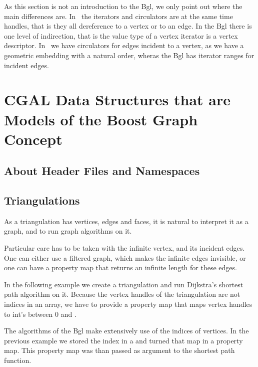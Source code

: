 As this section is not an introduction to the {\sc Bgl}, we only point out
where the main differences are. In \cgal\ the iterators and circulators
are at the same time handles, that is they all dereference to a vertex
or to an edge. In the {\sc Bgl} there is one level of indirection, that
is the value type of a vertex iterator is a vertex descriptor.  In \cgal\ 
we have circulators for edges incident to a vertex, as we have a
geometric embedding with a natural order, wheras the {\sc Bgl} 
has iterator ranges for incident edges.  




\section{CGAL Data Structures that are Models of the Boost Graph Concept}

\subsection{About Header Files and Namespaces}


\subsection{Triangulations}

As a triangulation has vertices, edges and faces, it is natural to interpret it as a graph,
and to run graph algorithms on it.  


Particular care has to be taken with the infinite vertex, and its incident
edges. One can either use a filtered graph, which makes the infinite edges
invisible, or one can have a property map that returns an infinite length
for these edges.




In the following example we create a triangulation and run Dijkstra's shortest path
algorithm on it. Because the vertex handles of the triangulation are not indices
in an array, we have to provide a property map that maps vertex handles to
int's between 0 and \ccc{t.number_of_vertices()}.




The algorithms of the {\sc Bgl} make extensively use of the indices of
vertices. In the previous example we stored the index in a 
and turned that map in a property map. This property map was than
passed as argument to the shortest path function.

